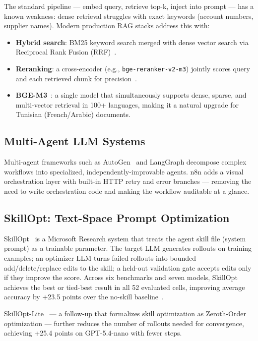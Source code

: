 The standard pipeline — embed query, retrieve top-k, inject into prompt — has a
known weakness: dense retrieval struggles with exact keywords (account numbers,
supplier names). Modern production RAG stacks address this with:

\begin{itemize}[leftmargin=*, itemsep=2pt]
  \item \textbf{Hybrid search}: BM25 keyword search merged with dense vector
        search via Reciprocal Rank Fusion (RRF)~\cite{rrf2009}.
  \item \textbf{Reranking}: a cross-encoder (e.g., \texttt{bge-reranker-v2-m3})
        jointly scores query and each retrieved chunk for precision~\cite{bgem3}.
  \item \textbf{BGE-M3}~\cite{bgem3}: a single model that simultaneously supports
        dense, sparse, and multi-vector retrieval in 100+ languages, making it a
        natural upgrade for Tunisian (French/Arabic) documents.
\end{itemize}

\subsection{Multi-Agent LLM Systems}

Multi-agent frameworks such as AutoGen~\cite{autogen2023} and LangGraph decompose
complex workflows into specialized, independently-improvable agents. n8n adds a
visual orchestration layer with built-in HTTP retry and error branches — removing
the need to write orchestration code and making the workflow auditable at a glance.

\subsection{SkillOpt: Text-Space Prompt Optimization}

SkillOpt~\cite{skillopt2024} is a Microsoft Research system that treats the agent
skill file (system prompt) as a trainable parameter. The target LLM generates
rollouts on training examples; an optimizer LLM turns failed rollouts into bounded
add/delete/replace edits to the skill; a held-out validation gate accepts edits
only if they improve the score. Across six benchmarks and seven models, SkillOpt
achieves the best or tied-best result in all 52 evaluated cells, improving average
accuracy by +23.5 points over the no-skill baseline~\cite{skillopt2024}.

SkillOpt-Lite~\cite{skilloptlite2025} — a follow-up that formalizes skill
optimization as Zeroth-Order optimization — further reduces the number of rollouts
needed for convergence, achieving +25.4 points on GPT-5.4-nano with fewer steps.

